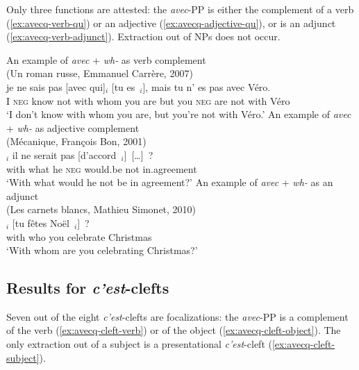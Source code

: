 Only three functions are attested: the \emph{avec}-PP is either the complement of a verb (\ref{ex:avecq-verb-qu}) or an adjective (\ref{ex:avecq-adjective-qu}), or is an adjunct (\ref{ex:avecq-verb-adjunct}). Extraction out of NPs does not occur.

\ea  An example of \emph{avec} + \emph{wh-} as verb complement\\
(Un roman russe, Emmanuel Carrère, 2007)\\
\gll [\dots] je ne sais pas [avec qui]$_i$ [tu es~\trace{}$_i$], mais tu n' es pas avec Véro.\\
{} I \textsc{neg} know not with whom you are but you \textsc{neg} are not with Véro\\
\glt `I don't know with whom you are, but you're not with Véro.'
\label{ex:avecq-verb-qu}
\ex An example of \emph{avec} + \emph{wh-} as adjective complement\\
(Mécanique, François Bon, 2001)\\
$_i$ il ne serait pas [d'accord~\trace{}$_i$]~[\dots]~?\\
{} with what he \textsc{neg} would.be not in.agreement\\
\glt `With what would he not be in agreement?'
\label{ex:avecq-adjective-qu}
\pagebreak
\ex An example of \emph{avec} + \emph{wh-} as an adjunct\\
(Les carnets blancs, Mathieu Simonet, 2010)\\
$_i$ [tu fêtes Noël~\trace{}$_i$]~?\\
with who you celebrate Christmas\\
\glt `With whom are you celebrating Christmas?'
\label{ex:avecq-verb-adjunct}
\z 

\subsection{Results for \emph{c'est}-clefts}

Seven out of the eight \emph{c'est}-clefts are focalizations: the \emph{avec}-PP is a complement of the verb (\ref{ex:avecq-cleft-verb}) or of the object (\ref{ex:avecq-cleft-object}). The only extraction out of a subject is a presentational \emph{c'est}-cleft (\ref{ex:avecq-cleft-subject}).

